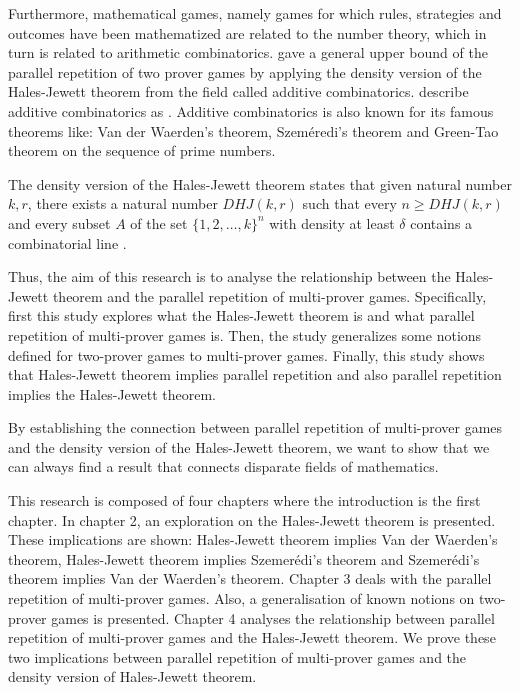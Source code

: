 Furthermore, mathematical games, namely games for which rules, strategies and outcomes have been mathematized are related to the number theory,
which in turn is related to  arithmetic combinatorics.
\cite{verbitsky1996towards} gave a general  upper bound of the parallel repetition of  two prover games by applying the density version of the Hales-Jewett theorem from the field called additive combinatorics. \cite*{taoadditive} describe
additive combinatorics  as  . Additive combinatorics is also known for its famous theorems like: Van der Waerden's theorem, Szeméredi's theorem and Green-Tao theorem on the sequence of prime numbers.


The density version of the Hales-Jewett theorem states that given natural number $k,r$, there exists a natural number $DHJ(k,r)$ such that every $n\geq DHJ(k,r)$ and every subset $A$ of the set $\{1,2,\ldots,k\}^n$ with density at least $\delta$  contains a  combinatorial line  \citep{polymath2012new}.

Thus, the aim of this research is to analyse the relationship between the Hales-Jewett theorem and the parallel repetition of multi-prover games. Specifically, first  this study explores what  the Hales-Jewett theorem is and what  parallel repetition of multi-prover games is. Then, the study  generalizes some notions defined for two-prover games to multi-prover games.  Finally, this study shows that Hales-Jewett theorem implies parallel repetition and also parallel repetition implies the Hales-Jewett theorem.



By establishing the connection between parallel repetition of multi-prover games and the density version of the Hales-Jewett theorem, we want to show that we can always find a result that connects disparate fields of mathematics.

This research is composed of four chapters where the introduction is the first chapter. In chapter 2, an exploration on the Hales-Jewett theorem is presented. These implications are shown:  Hales-Jewett theorem implies Van der Waerden's theorem, Hales-Jewett theorem implies Szemerédi's theorem and Szemerédi's theorem implies Van der Waerden's theorem. Chapter 3 deals with the parallel repetition of  multi-prover games. Also, a generalisation of  known notions on two-prover games is presented. Chapter 4 analyses the relationship between parallel repetition of multi-prover games and the Hales-Jewett theorem.  We prove these two implications between  parallel repetition of multi-prover games and the density version of Hales-Jewett theorem. 



%
%





